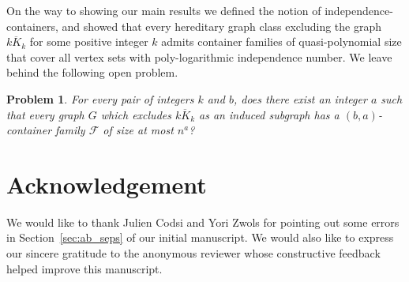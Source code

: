 \documentclass[11pt]{amsart}
\newtheorem{problem}[conjecture]{Problem}
\newcommand{\cal}{\mathcal}
\begin{document}
On the way to showing our main results we defined the notion of independence-containers, and showed that every hereditary graph class excluding the graph $\overline{kK_k}$ for some positive integer $k$ admits container families of quasi-polynomial size that cover all vertex sets with poly-logarithmic independence number. We leave behind the following open problem.

\begin{problem}
    For every pair of integers $k$ and $b$, does there exist an integer $a$ such that every graph $G$ which excludes $\overline{kK_k}$ as an induced subgraph has a $(b, a)$-container family ${\cal F}$ of size at most $n^{a}$?
\end{problem}

\section{Acknowledgement}\label{sec:acknowledgement}
    We would like to thank Julien Codsi and Yori Zwols for pointing out some errors in Section~\ref{sec:ab_seps} of our initial manuscript. We would also like to express our sincere gratitude to the anonymous reviewer whose constructive feedback helped improve this manuscript.



\end{document}
